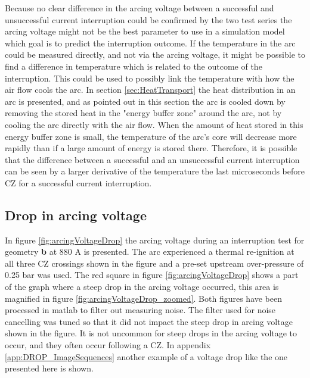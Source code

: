 \documentclass[10pt,b5paper,twoside]{article}
\begin{document}
Because no clear difference in the arcing voltage between a successful and unsuccessful current interruption could be confirmed by the two test series the arcing voltage might not be the best parameter to use in a simulation model which goal is to predict the interruption outcome. If the temperature in the arc could be measured directly, and not via the arcing voltage, it might be possible to find a difference in temperature which is related to the outcome of the interruption. This could be used to possibly link the temperature with how the air flow cools the arc. In section \ref{sec:HeatTransport} the heat distribution in an arc is presented, and as pointed out in this section the arc is cooled down by removing the stored heat in the "energy buffer zone" around the arc, not by cooling the arc directly with the air flow. When the amount of heat stored in this energy buffer zone is small, the temperature of the arc's core will decrease more rapidly than if a large amount of energy is stored there. Therefore, it is possible that the difference between a successful and an unsuccessful current interruption can be seen by a larger derivative of the temperature the last microseconds before CZ for a successful current interruption.


\newpage
\subsection{Drop in arcing voltage} \label{sec:results_drop_arcing_voltage}

In figure \ref{fig:arcingVoltageDrop} the arcing voltage during an interruption test for geometry \textbf{b} at 880 A is presented. The arc experienced a thermal re-ignition at all three CZ crossings shown in the figure and a pre-set upstream over-pressure of 0.25 bar was used. The red square in figure \ref{fig:arcingVoltageDrop} shows a part of the graph where a steep drop in the arcing voltage occurred, this area is magnified in figure \ref{fig:arcingVoltageDrop_zoomed}. Both figures have been processed in matlab to filter out measuring noise. The filter used for noise cancelling was tuned so that it did not impact the steep drop in arcing voltage shown in the figure. It is not uncommon for steep drops in the arcing voltage to occur, and they often occur following a CZ. In appendix \ref{app:DROP_ImageSequences} another example of a voltage drop like the one presented here is shown. 
\end{document}

